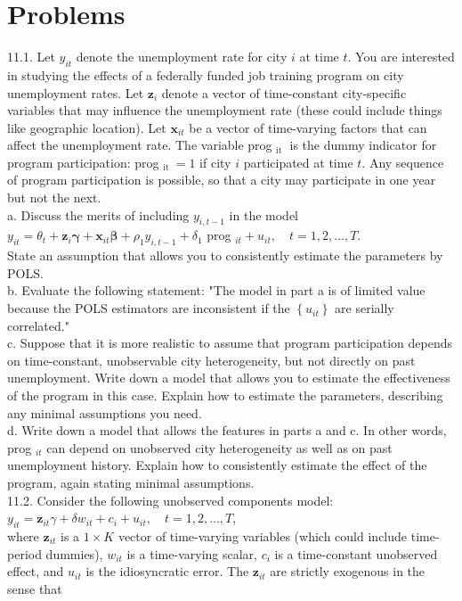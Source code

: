 \documentclass[10pt]{article}
\begin{document}
\section*{Problems}
11.1. Let $y_{i t}$ denote the unemployment rate for city $i$ at time $t$. You are interested in studying the effects of a federally funded job training program on city unemployment rates. Let $\mathbf{z}_{i}$ denote a vector of time-constant city-specific variables that may influence the unemployment rate (these could include things like geographic location). Let $\mathbf{x}_{i t}$ be a vector of time-varying factors that can affect the unemployment rate. The variable prog $_{\text {it }}$ is the dummy indicator for program participation: prog $_{\text {it }}=1$ if city $i$ participated at time $t$. Any sequence of program participation is possible, so that a city may participate in one year but not the next.\\
a. Discuss the merits of including $y_{i, t-1}$ in the model\\
$y_{i t}=\theta_{t}+\mathbf{z}_{i} \boldsymbol{\gamma}+\mathbf{x}_{i t} \boldsymbol{\beta}+\rho_{1} y_{i, t-1}+\delta_{1}$ prog $_{i t}+u_{i t}, \quad t=1,2, \ldots, T$.\\
State an assumption that allows you to consistently estimate the parameters by POLS.\\
b. Evaluate the following statement: "The model in part a is of limited value because the POLS estimators are inconsistent if the $\left\{u_{i t}\right\}$ are serially correlated."\\
c. Suppose that it is more realistic to assume that program participation depends on time-constant, unobservable city heterogeneity, but not directly on past unemployment. Write down a model that allows you to estimate the effectiveness of the program in this case. Explain how to estimate the parameters, describing any minimal assumptions you need.\\
d. Write down a model that allows the features in parts a and c. In other words, prog $_{i t}$ can depend on unobserved city heterogeneity as well as on past unemployment history. Explain how to consistently estimate the effect of the program, again stating minimal assumptions.\\
11.2. Consider the following unobserved components model:\\
$y_{i t}=\mathbf{z}_{i t} \gamma+\delta w_{i t}+c_{i}+u_{i t}, \quad t=1,2, \ldots, T$,\\
where $\mathbf{z}_{i t}$ is a $1 \times K$ vector of time-varying variables (which could include time-period dummies), $w_{i t}$ is a time-varying scalar, $c_{i}$ is a time-constant unobserved effect, and $u_{i t}$ is the idiosyncratic error. The $\mathbf{z}_{i t}$ are strictly exogenous in the sense that\\
\end{document}
